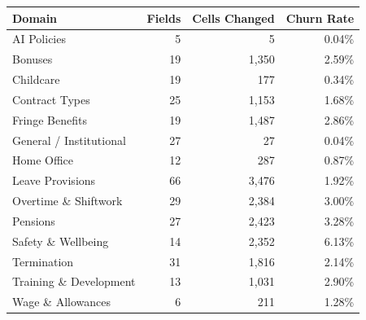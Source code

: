\begin{tabular}{lrrr}
    \hline\hline
    Domain & Fields & Cells Changed & Churn Rate \\
    \hline
    AI Policies & 5 & 5 & 0.04\% \\
    Bonuses & 19 & 1,350 & 2.59\% \\
    Childcare & 19 & 177 & 0.34\% \\
    Contract Types & 25 & 1,153 & 1.68\% \\
    Fringe Benefits & 19 & 1,487 & 2.86\% \\
    General / Institutional & 27 & 27 & 0.04\% \\
    Home Office & 12 & 287 & 0.87\% \\
    Leave Provisions & 66 & 3,476 & 1.92\% \\
    Overtime \& Shiftwork & 29 & 2,384 & 3.00\% \\
    Pensions & 27 & 2,423 & 3.28\% \\
    Safety \& Wellbeing & 14 & 2,352 & 6.13\% \\
    Termination & 31 & 1,816 & 2.14\% \\
    Training \& Development & 13 & 1,031 & 2.90\% \\
    Wage \& Allowances & 6 & 211 & 1.28\% \\
    \hline\hline
\end{tabular}
